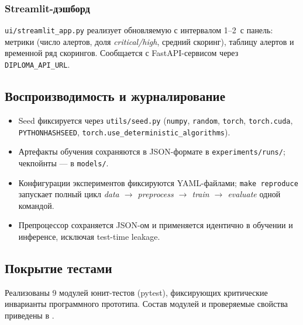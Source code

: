 \subsubsection{Streamlit-дэшборд}

\texttt{ui/streamlit\_app.py} реализует обновляемую с интервалом
1--2~с панель: метрики (число алертов, доля \emph{critical/high},
средний скоринг), таблицу алертов и временной ряд скорингов.
Сообщается с FastAPI-сервисом через \texttt{DIPLOMA\_API\_URL}.

\subsection{Воспроизводимость и журналирование}

\begin{itemize}
    \item Seed фиксируется через \texttt{utils/seed.py}
    (\texttt{numpy}, \texttt{random}, \texttt{torch}, \texttt{torch.cuda},
    \texttt{PYTHONHASHSEED}, \texttt{torch.use\_deterministic\_algorithms}).
    \item Артефакты обучения сохраняются в JSON-формате в
    \texttt{experiments/runs/}; чекпойнты --- в \texttt{models/}.
    \item Конфигурации экспериментов фиксируются YAML-файлами;
    \texttt{make reproduce} запускает полный цикл
    \emph{data $\to$ preprocess $\to$ train $\to$ evaluate}
    одной командой.
    \item Препроцессор сохраняется JSON-ом и применяется идентично в
    обучении и инференсе, исключая test-time leakage.
\end{itemize}

\subsection{Покрытие тестами}

Реализованы 9 модулей юнит-тестов (pytest), фиксирующих критические
инварианты программного прототипа. Состав модулей и проверяемые
свойства приведены в .

